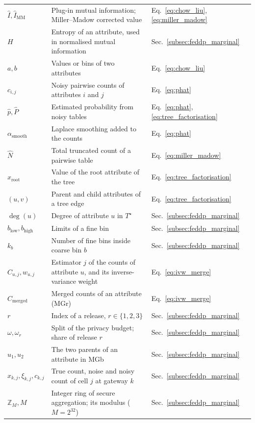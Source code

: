 \begin{longtable}{lL{10.5cm}L{2.9cm}}
$\hat{I}, \hat{I}_{\text{MM}}$ & Plug-in mutual information; Miller--Madow corrected value & Eq.~\eqref{eq:chow_liu}, \eqref{eq:miller_madow} \\
$H$ & Entropy of an attribute, used in normalised mutual information & Sec.~\ref{subsec:feddp_marginal} \\
$a, b$ & Values or bins of two attributes & Eq.~\eqref{eq:chow_liu} \\
$c_{i,j}$ & Noisy pairwise counts of attributes $i$ and $j$ & Eq.~\eqref{eq:phat} \\
$\hat{p}, \hat{P}$ & Estimated probability from noisy tables & Eq.~\eqref{eq:phat}, \eqref{eq:tree_factorisation} \\
$\alpha_{\text{smooth}}$ & Laplace smoothing added to the counts & Eq.~\eqref{eq:phat} \\
$\hat{N}$ & Total truncated count of a pairwise table & Eq.~\eqref{eq:miller_madow} \\
$x_{\text{root}}$ & Value of the root attribute of the tree & Eq.~\eqref{eq:tree_factorisation} \\
$(u, v)$ & Parent and child attributes of a tree edge & Eq.~\eqref{eq:tree_factorisation} \\
$\deg(u)$ & Degree of attribute $u$ in $T^\star$ & Sec.~\ref{subsec:feddp_marginal} \\
$b_{\text{low}}, b_{\text{high}}$ & Limits of a fine bin & Sec.~\ref{subsec:feddp_marginal} \\
$k_b$ & Number of fine bins inside coarse bin $b$ & Sec.~\ref{subsec:feddp_marginal} \\
$\hat{C}_{u,j}, w_{u,j}$ & Estimator $j$ of the counts of attribute $u$, and its inverse-variance weight & Eq.~\eqref{eq:ivw_merge} \\
$\hat{C}_{\text{merged}}$ & Merged counts of an attribute (MGr) & Eq.~\eqref{eq:ivw_merge} \\
$r$ & Index of a release, $r \in \{1, 2, 3\}$ & Sec.~\ref{subsec:feddp_marginal} \\
$\omega, \omega_r$ & Split of the privacy budget; share of release $r$ & Sec.~\ref{subsec:feddp_marginal} \\
$u_1, u_2$ & The two parents of an attribute in MGb & Sec.~\ref{subsec:feddp_marginal} \\
$x_{k,j}, \xi_{k,j}, c_{k,j}$ & True count, noise and noisy count of cell $j$ at gateway $k$ & Sec.~\ref{subsec:feddp_marginal} \\
$\mathbb{Z}_M, M$ & Integer ring of secure aggregation; its modulus ($M = 2^{32}$) & Sec.~\ref{subsec:feddp_marginal} \\

\end{longtable}
